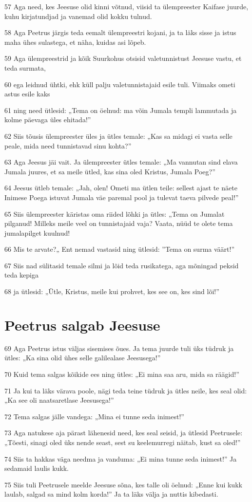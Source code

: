 \par 57 Aga need, kes Jeesuse olid kinni võtnud, viisid ta ülempreester Kaifase juurde, kuhu kirjatundjad ja vanemad olid kokku tulnud.
\par 58 Aga Peetrus järgis teda eemalt ülempreestri kojani, ja ta läks sisse ja istus maha ühes sulastega, et näha, kuidas asi lõpeb.
\par 59 Aga ülempreestrid ja kõik Suurkohus otsisid valetunnistust Jeesuse vastu, et teda surmata,
\par 60 ega leidnud ühtki, ehk küll palju valetunnistajaid esile tuli. Viimaks ometi astus esile kaks
\par 61 ning need ütlesid: „Tema on öelnud: ma võin Jumala templi lammutada ja kolme päevaga üles ehitada!”
\par 62 Siis tõusis ülempreester üles ja ütles temale: „Kas sa midagi ei vasta selle peale, mida need tunnistavad sinu kohta?”
\par 63 Aga Jeesus jäi vait. Ja ülempreester ütles temale: „Ma vannutan sind elava Jumala juures, et sa meile ütled, kas sina oled Kristus, Jumala Poeg?”
\par 64 Jeesus ütleb temale: „Jah, olen! Ometi ma ütlen teile: sellest ajast te näete Inimese Poega istuvat Jumala väe paremal pool ja tulevat taeva pilvede peal!”
\par 65 Siis ülempreester käristas oma riided lõhki ja ütles: „Tema on Jumalat pilganud! Milleks meile veel on tunnistajaid vaja? Vaata, nüüd te olete tema jumalapilget kuulnud!
\par 66 Mis te arvate?„ Ent nemad vastasid ning ütlesid: ”Tema on surma väärt!”
\par 67 Siis nad sülitasid temale silmi ja lõid teda rusikatega, aga mõningad peksid teda kepiga
\par 68 ja ütlesid: „Ütle, Kristus, meile kui prohvet, kes see on, kes sind lõi!”

\section*{Peetrus salgab Jeesuse}

\par 69 Aga Peetrus istus väljas sisemises õues. Ja tema juurde tuli üks tüdruk ja ütles: „Ka sina olid ühes selle galilealase Jeesusega!”
\par 70 Kuid tema salgas kõikide ees ning ütles: „Ei mina saa aru, mida sa räägid!”
\par 71 Ja kui ta läks värava poole, nägi teda teine tüdruk ja ütles neile, kes seal olid: „Ka see oli naatsaretlase Jeesusega!”
\par 72 Tema salgas jälle vandega: „Mina ei tunne seda inimest!”
\par 73 Aga natukese aja pärast lähenesid need, kes seal seisid, ja ütlesid Peetrusele: „Tõesti, sinagi oled üks nende seast, sest su keelemurregi näitab, kust sa oled!”
\par 74 Siis ta hakkas väga needma ja vanduma: „Ei mina tunne seda inimest!” Ja sedamaid laulis kukk.
\par 75 Siis tuli Peetrusele meelde Jeesuse sõna, kes talle oli öelnud: „Enne kui kukk laulab, salgad sa mind kolm korda!” Ja ta läks välja ja nuttis kibedasti.


